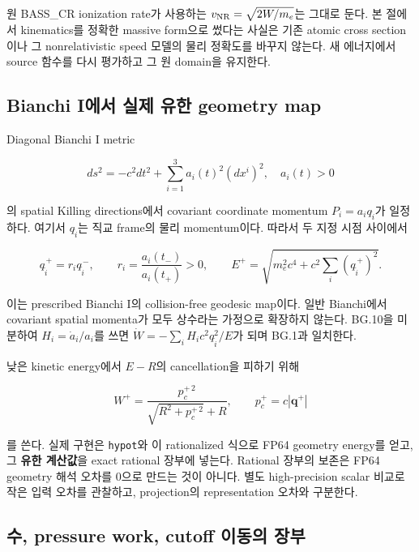 원 BASS\_CR ionization rate가 사용하는 \(v_{\rm NR}=\sqrt{2W/m_e}\)는 그대로 둔다. 본 절에서 kinematics를 정확한 massive form으로 썼다는 사실은 기존 atomic cross section이나 그 nonrelativistic speed 모델의 물리 정확도를 바꾸지 않는다. 새 에너지에서 source 함수를 다시 평가하고 그 원 domain을 유지한다.

\hypertarget{bianchi-iuxc5d0uxc11c-uxc2e4uxc81c-uxc720uxd55c-geometry-map}{%
\subsection{Bianchi I에서 실제 유한 geometry map}\label{bianchi-iuxc5d0uxc11c-uxc2e4uxc81c-uxc720uxd55c-geometry-map}}

Diagonal Bianchi I metric

\[ds^2=-c^2dt^2+\sum_{i=1}^3 a_i(t)^2(dx^i)^2,\quad a_i(t)>0\tag{BG.9}\]

의 spatial Killing directions에서 covariant coordinate momentum \(P_i=a_iq_{\hat i}\)가 일정하다. 여기서 \(q_{\hat i}\)는 직교 frame의 물리 momentum이다. 따라서 두 지정 시점 사이에서

\[q_{\hat i}^{\,+}=r_iq_{\hat i}^{\,-},\qquad r_i=\frac{a_i(t_-)}{a_i(t_+)}>0,\qquad
E^+=\sqrt{m_e^2c^4+c^2\sum_i(q_{\hat i}^{\,+})^2}.\tag{BG.10}\]

이는 prescribed Bianchi I의 collision-free geodesic map이다. 일반 Bianchi에서 covariant spatial momenta가 모두 상수라는 가정으로 확장하지 않는다. BG.10을 미분하여 \(H_i=\dot a_i/a_i\)를 쓰면 \(\dot W=-\sum_iH_i c^2q_{\hat i}^2/E\)가 되며 BG.1과 일치한다.

낮은 kinetic energy에서 \(E-R\)의 cancellation을 피하기 위해

\[W^+=\frac{p_c^{+\,2}}{\sqrt{R^2+p_c^{+\,2}}+R},\qquad p_c^+=c|\mathbf q^+|\tag{BG.11}\]

를 쓴다. 실제 구현은 \texttt{hypot}와 이 rationalized 식으로 FP64 geometry energy를 얻고, 그 \textbf{유한 계산값}을 exact rational 장부에 넣는다. Rational 장부의 보존은 FP64 geometry 해석 오차를 0으로 만드는 것이 아니다. 별도 high-precision scalar 비교로 작은 입력 오차를 관찰하고, projection의 representation 오차와 구분한다.

\hypertarget{uxc218-pressure-work-cutoff-uxc774uxb3d9uxc758-uxc7a5uxbd80}{%
\subsection{수, pressure work, cutoff 이동의 장부}\label{uxc218-pressure-work-cutoff-uxc774uxb3d9uxc758-uxc7a5uxbd80}}

